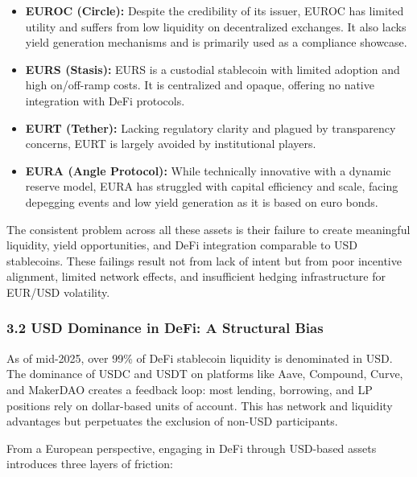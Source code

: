 \begin{itemize}
\item
  \textbf{EUROC (Circle):} Despite the credibility of its issuer, EUROC
  has limited utility and suffers from low liquidity on decentralized
  exchanges. It also lacks yield generation mechanisms and is primarily
  used as a compliance showcase.
\item
  \textbf{EURS (Stasis):} EURS is a custodial stablecoin with limited
  adoption and high on/off-ramp costs. It is centralized and opaque,
  offering no native integration with DeFi protocols.
\item
  \textbf{EURT (Tether):} Lacking regulatory clarity and plagued by
  transparency concerns, EURT is largely avoided by institutional
  players.
\item
  \textbf{EURA (Angle Protocol):} While technically innovative with a
  dynamic reserve model, EURA has struggled with capital efficiency and
  scale, facing depegging events and low yield generation as it is based
  on euro bonds.
\end{itemize}

The consistent problem across all these assets is their failure to
create meaningful liquidity, yield opportunities, and DeFi integration
comparable to USD stablecoins. These failings result not from lack of
intent but from poor incentive alignment, limited network effects, and
insufficient hedging infrastructure for EUR/USD volatility.

\hypertarget{usd-dominance-in-defi-a-structural-bias}{%
\subsubsection{3.2 USD Dominance in DeFi: A Structural
Bias}\label{usd-dominance-in-defi-a-structural-bias}}

As of mid-2025, over 99\% of DeFi stablecoin liquidity is denominated in
USD. The dominance of USDC and USDT on platforms like Aave, Compound,
Curve, and MakerDAO creates a feedback loop: most lending, borrowing,
and LP positions rely on dollar-based units of account. This has network
and liquidity advantages but perpetuates the exclusion of non-USD
participants.

From a European perspective, engaging in DeFi through USD-based assets
introduces three layers of friction:

